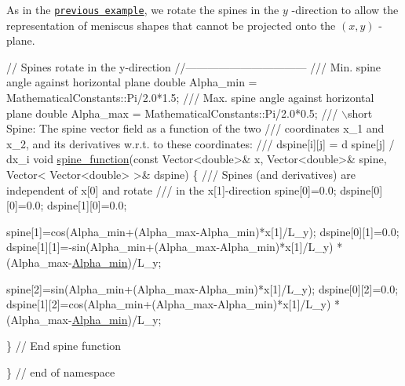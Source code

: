 As in the \href{../../young_laplace/html/index.html}{\tt previous example}, we rotate the spines in the $ y $ -\/direction to allow the representation of meniscus shapes that cannot be projected onto the $ (x,y) $ -\/plane.


\begin{DoxyCodeInclude}
 
 

 \textcolor{comment}{// Spines rotate in the y-direction}
 \textcolor{comment}{//---------------------------------}
\textcolor{comment}{}
\textcolor{comment}{ /// Min. spine angle against horizontal plane}
\textcolor{comment}{} \textcolor{keywordtype}{double} Alpha\_min = MathematicalConstants::Pi/2.0*1.5;
\textcolor{comment}{}
\textcolor{comment}{ /// Max. spine angle against horizontal plane}
\textcolor{comment}{} \textcolor{keywordtype}{double} Alpha\_max = MathematicalConstants::Pi/2.0*0.5;
\textcolor{comment}{}
\textcolor{comment}{ /// \(\backslash\)short Spine: The spine vector field as a function of the two }
\textcolor{comment}{ /// coordinates x\_1 and x\_2, and its derivatives w.r.t. to these coordinates:}
\textcolor{comment}{ /// dspine[i][j] = d spine[j] / dx\_i}
\textcolor{comment}{} \textcolor{keywordtype}{void} \hyperlink{namespaceGlobalParameters_a82df8c67f58e78a236fb6a0cc8bf8284}{spine\_function}(\textcolor{keyword}{const} Vector<double>& x, 
                     Vector<double>& spine, 
                     Vector< Vector<double> >& dspine)
 \{
  \textcolor{comment}{}
\textcolor{comment}{  /// Spines (and derivatives)  are independent of x[0] and rotate }
\textcolor{comment}{  /// in the x[1]-direction}
\textcolor{comment}{}  spine[0]=0.0;
  dspine[0][0]=0.0; 
  dspine[1][0]=0.0; 
  
  spine[1]=cos(Alpha\_min+(Alpha\_max-Alpha\_min)*x[1]/L\_y); 
  dspine[0][1]=0.0;                                   
  dspine[1][1]=-sin(Alpha\_min+(Alpha\_max-Alpha\_min)*x[1]/L\_y)
   *(Alpha\_max-\hyperlink{namespaceGlobalParameters_ae8fa7610a34b7a2a8223eade99a5c22f}{Alpha\_min})/L\_y;            
  
  spine[2]=sin(Alpha\_min+(Alpha\_max-Alpha\_min)*x[1]/L\_y);
  dspine[0][2]=0.0;                                  
  dspine[1][2]=cos(Alpha\_min+(Alpha\_max-Alpha\_min)*x[1]/L\_y) 
   *(Alpha\_max-\hyperlink{namespaceGlobalParameters_ae8fa7610a34b7a2a8223eade99a5c22f}{Alpha\_min})/L\_y;            

 \} \textcolor{comment}{// End spine function}


\} \textcolor{comment}{// end of namespace}

\end{DoxyCodeInclude}




